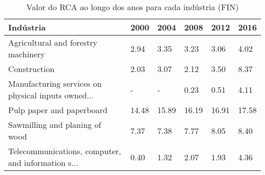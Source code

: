 \begin{table}
\centering
\caption{Valor do RCA ao longo dos anos para cada indústria (FIN)}
\label{tab:ex3-tempo-FIN}
\begin{tabular}{p{6cm}p{1.5cm}p{1.5cm}p{1.5cm}p{1.5cm}p{1.5cm}}
\toprule
                                         Indústria &  2000 &  2004 &  2008 &  2012 &  2016 \\
\midrule
               Agricultural and forestry machinery &  2.94 &  3.35 &  3.23 &  3.06 &  4.02 \\
                                      Construction &  2.03 &  3.07 &  2.12 &  3.50 &  8.37 \\
Manufacturing services on physical inputs owned... &     - &     - &  0.23 &  0.51 &  4.11 \\
                         Pulp paper and paperboard & 14.48 & 15.89 & 16.19 & 16.91 & 17.58 \\
                    Sawmilling and planing of wood &  7.37 &  7.38 &  7.77 &  8.05 &  8.40 \\
Telecommunications, computer, and information s... &  0.40 &  1.32 &  2.07 &  1.93 &  4.36 \\
\bottomrule
\end{tabular}
\end{table}

